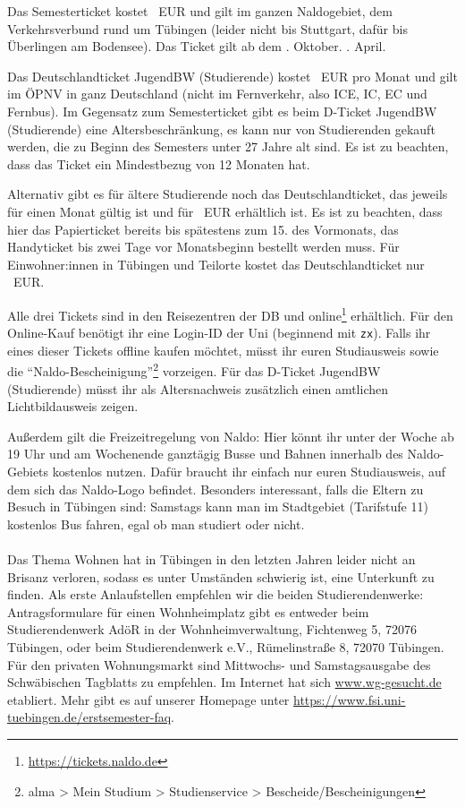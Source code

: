     Das Semesterticket kostet \semesterticketpreis~EUR und gilt im ganzen Naldogebiet, dem Verkehrsverbund rund um Tübingen (leider nicht bis Stuttgart, dafür bis Überlingen am Bodensee).
    Das Ticket gilt ab dem
    . Oktober.
    \fi
    . April.
    \fi

    Das Deutschlandticket JugendBW (Studierende) kostet \jugendticketbwpreis~EUR pro Monat und gilt im ÖPNV in ganz Deutschland (nicht im Fernverkehr, also ICE, IC, EC und Fernbus). Im Gegensatz zum Semesterticket gibt es beim D-Ticket JugendBW (Studierende) eine Altersbeschränkung,
    es kann nur von Studierenden gekauft werden, die zu Beginn des Semesters unter 27 Jahre alt sind. Es ist zu beachten, dass das Ticket ein Mindestbezug von 12 Monaten hat.

    Alternativ gibt es für ältere Studierende noch das Deutschlandticket, das jeweils für einen Monat gültig ist und für \detickettuepreis~EUR erhältlich ist. 
    Es ist zu beachten, dass hier das Papierticket bereits bis spätestens zum 15. des Vormonats, das Handyticket bis zwei Tage vor Monatsbeginn bestellt werden muss.
    Für Einwohner:innen in Tübingen und Teilorte kostet das Deutschlandticket nur \detickettuebewohnipreis~EUR.

    Alle drei Tickets sind in den Reisezentren der DB und online\footnote{\url{https://tickets.naldo.de}} erhältlich. Für den Online-Kauf benötigt ihr eine Login-ID der Uni (beginnend mit \texttt{zx}). Falls ihr eines dieser Tickets offline kaufen möchtet, müsst ihr euren Studiausweis
    sowie die "`Naldo-Bescheinigung"'\footnote{alma > Mein Studium > Studienservice > Bescheide/Bescheinigungen} vorzeigen. Für das D-Ticket JugendBW (Studierende) müsst ihr als Altersnachweis zusätzlich einen amtlichen Lichtbildausweis zeigen. 
    
    Außerdem gilt die Freizeitregelung von Naldo: Hier könnt ihr unter der Woche ab 19 Uhr und am Wochenende ganztägig Busse und Bahnen innerhalb des Naldo-Gebiets kostenlos nutzen. Dafür braucht ihr einfach nur euren Studiausweis, auf dem sich das Naldo-Logo befindet.
    Besonders interessant, falls die Eltern zu Besuch in Tübingen sind: Samstags kann man im Stadtgebiet (Tarifstufe 11) kostenlos Bus fahren, egal ob man studiert oder nicht. \\\\

    Das Thema Wohnen hat in Tübingen in den letzten Jahren leider nicht an Brisanz verloren, sodass
    es unter Umständen schwierig ist, eine Unterkunft zu finden. Als erste Anlaufstellen empfehlen wir
    die beiden Studierendenwerke: Antragsformulare für einen Wohnheimplatz gibt es entweder beim
    Studierendenwerk AdöR in der Wohnheimverwaltung, Fichtenweg 5, 72076 Tübingen, oder beim Studierendenwerk
    e.V., Rümelinstraße 8, 72070 Tübingen. Für den privaten Wohnungsmarkt sind Mittwochs- und Samstagsausgabe
    des Schwäbischen Tagblatts zu empfehlen.
    Im Internet hat sich \url{www.wg-gesucht.de} etabliert. Mehr gibt es auf unserer Homepage unter \url{https://www.fsi.uni-tuebingen.de/erstsemester-faq}.
    \fi
